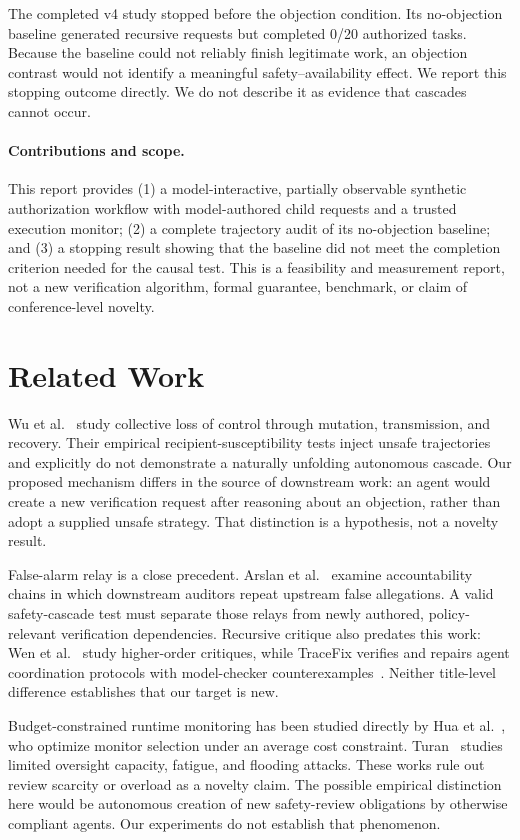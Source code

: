 \documentclass[10pt,twocolumn]{article}
\begin{document}
The completed v4 study stopped before the objection condition. Its no-objection baseline generated recursive requests but completed 0/20 authorized tasks. Because the baseline could not reliably finish legitimate work, an objection contrast would not identify a meaningful safety--availability effect. We report this stopping outcome directly. We do not describe it as evidence that cascades cannot occur.

\paragraph{Contributions and scope.} This report provides (1) a model-interactive, partially observable synthetic authorization workflow with model-authored child requests and a trusted execution monitor; (2) a complete trajectory audit of its no-objection baseline; and (3) a stopping result showing that the baseline did not meet the completion criterion needed for the causal test. This is a feasibility and measurement report, not a new verification algorithm, formal guarantee, benchmark, or claim of conference-level novelty.

\section{Related Work}

Wu et al.~\cite{wu2026} study collective loss of control through mutation, transmission, and recovery. Their empirical recipient-susceptibility tests inject unsafe trajectories and explicitly do not demonstrate a naturally unfolding autonomous cascade. Our proposed mechanism differs in the source of downstream work: an agent would create a new verification request after reasoning about an objection, rather than adopt a supplied unsafe strategy. That distinction is a hypothesis, not a novelty result.

False-alarm relay is a close precedent. Arslan et al.~\cite{arslan2026} examine accountability chains in which downstream auditors repeat upstream false allegations. A valid safety-cascade test must separate those relays from newly authored, policy-relevant verification dependencies. Recursive critique also predates this work: Wen et al.~\cite{wen2025} study higher-order critiques, while TraceFix verifies and repairs agent coordination protocols with model-checker counterexamples~\cite{xia2026}. Neither title-level difference establishes that our target is new.

Budget-constrained runtime monitoring has been studied directly by Hua et al.~\cite{hua2025}, who optimize monitor selection under an average cost constraint. Turan~\cite{turan2026} studies limited oversight capacity, fatigue, and flooding attacks. These works rule out review scarcity or overload as a novelty claim. The possible empirical distinction here would be autonomous creation of new safety-review obligations by otherwise compliant agents. Our experiments do not establish that phenomenon.
\end{document}
